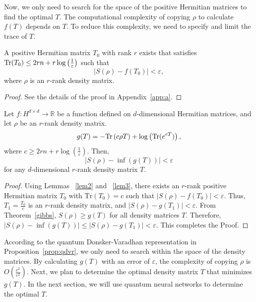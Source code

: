 \documentclass[aps,groupedaddress,superscriptaddress,amssymb,amsmath,amsbsy,amsfonts,twocolumn,pra]{revtex4}
\begin{document}
Now, we only need to search for the space of the positive Hermitian matrices to find the optimal $T$. The computational complexity of copying $\rho$ to calculate $f(T)$ depends on $T$. To reduce this complexity, we need to specify and limit the trace of $T$.

\begin{lemma}[] \label{lem3}
A positive Hermitian matrix $T_0$ with rank $r$ exists that satisfies $\mbox{$\textnormal{Tr}$}(T_0) \leq 2rn + r\log\left(\frac{1}{\varepsilon}\right)$ such that
\begin{equation} \label{trace reduction}
\left|S(\rho) - f(T_0)\right| < \varepsilon,
\end{equation}
where $\rho$ is an $r$-rank density matrix.
\end{lemma}

\begin{proof}
See the details of the proof in Appendix~\ref{app:a}.
\end{proof}

\begin{proposition} \label{prop:qdvr}
Let $f: H^{d \times d} \rightarrow \mathbb{R}$ be a function defined on $d$-dimensional Hermitian matrices, and let $\rho$ be an $r$-rank density matrix.
\begin{equation} \label{eq:qdv}
g(T) =-\mbox{$\textnormal{Tr}$}\left(c \rho T\right) + \log\left(\mbox{$\textnormal{Tr}$}(e^{cT})\right),
\end{equation}
where $c \geq 2rn + r\log\left(\frac{1}{\varepsilon}\right)$. Then,
\begin{equation} \label{qdv}
\left|S(\rho) - \inf(g(T))\right| < \varepsilon
\end{equation}
for any $d$-dimensional $r$-rank density matrix $T$.
\end{proposition}

\begin{proof}
Using Lemmas ~\ref{lem2} and ~\ref{lem3}, there exists an $r$-rank positive Hermitian matrix $T_0$ with $\text{Tr}(T_0) = c$ such that $|S(\rho) - f(T_0)| < \varepsilon$. Thus, $T_1 = \frac{T_0}{c}$ is an $r$-rank density matrix, and $|S(\rho) - g(T_1)| < \varepsilon$. From Theorem~\ref{gibbs}, $S(\rho) \geq g(T)$ for all density matrices $T$. Therefore, $\left|S(\rho) - \inf(g(T))\right| \leq \left|S(\rho) - g(T_1)\right| < \varepsilon$. This completes the Proof.
\end{proof}

According to the quantum Donsker-Varadhan representation in Proposition~\ref{prop:qdvr}, we only need to search within the space of the density matrices. By calculating $g(T)$ with an error of $\varepsilon$, the complexity of copying $\rho$ is $O(\frac{c^2}{\varepsilon^2})$. Next, we plan to determine the optimal density matrix $T$ that minimizes $g(T)$. In the next section, we will use quantum neural networks to determine the optimal $T$.
\end{document}
